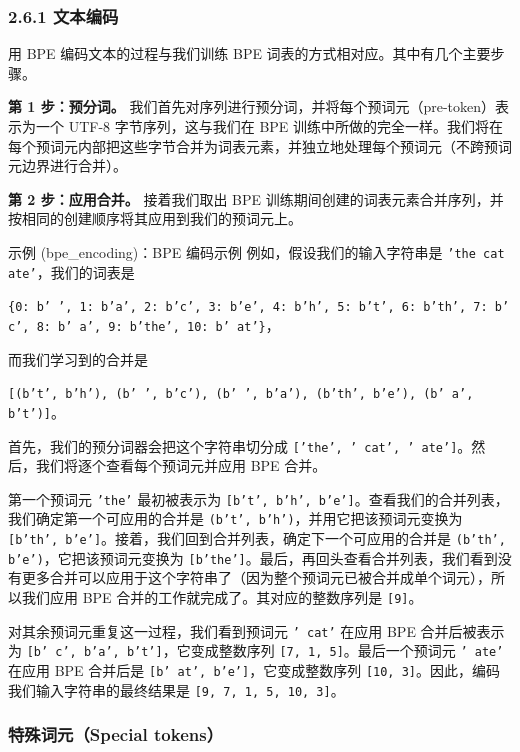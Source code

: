 \subsubsection*{2.6.1 文本编码}

用 BPE 编码文本的过程与我们训练 BPE 词表的方式相对应。其中有几个主要步骤。

\textbf{第 1 步：预分词。} 我们首先对序列进行预分词，并将每个预词元（pre-token）表示为一个 UTF-8 字节序列，这与我们在 BPE 训练中所做的完全一样。我们将在每个预词元内部把这些字节合并为词表元素，并独立地处理每个预词元（不跨预词元边界进行合并）。

\textbf{第 2 步：应用合并。} 接着我们取出 BPE 训练期间创建的词表元素合并序列，并按相同的创建顺序将其应用到我们的预词元上。

\begin{problembox}{示例 (bpe\_encoding)：BPE 编码示例}
例如，假设我们的输入字符串是 \texttt{'the cat ate'}，我们的词表是
\begin{center}
\texttt{\{0: b' ', 1: b'a', 2: b'c', 3: b'e', 4: b'h', 5: b't', 6: b'th', 7: b' c', 8: b' a', 9: b'the', 10: b' at'\}}，
\end{center}
而我们学习到的合并是
\begin{center}
\texttt{[(b't', b'h'), (b' ', b'c'), (b' ', b'a'), (b'th', b'e'), (b' a', b't')]}。
\end{center}
首先，我们的预分词器会把这个字符串切分成 \texttt{['the', ' cat', ' ate']}。然后，我们将逐个查看每个预词元并应用 BPE 合并。

第一个预词元 \texttt{'the'} 最初被表示为 \texttt{[b't', b'h', b'e']}。查看我们的合并列表，我们确定第一个可应用的合并是 \texttt{(b't', b'h')}，并用它把该预词元变换为 \texttt{[b'th', b'e']}。接着，我们回到合并列表，确定下一个可应用的合并是 \texttt{(b'th', b'e')}，它把该预词元变换为 \texttt{[b'the']}。最后，再回头查看合并列表，我们看到没有更多合并可以应用于这个字符串了（因为整个预词元已被合并成单个词元），所以我们应用 BPE 合并的工作就完成了。其对应的整数序列是 \texttt{[9]}。

对其余预词元重复这一过程，我们看到预词元 \texttt{' cat'} 在应用 BPE 合并后被表示为 \texttt{[b' c', b'a', b't']}，它变成整数序列 \texttt{[7, 1, 5]}。最后一个预词元 \texttt{' ate'} 在应用 BPE 合并后是 \texttt{[b' at', b'e']}，它变成整数序列 \texttt{[10, 3]}。因此，编码我们输入字符串的最终结果是 \texttt{[9, 7, 1, 5, 10, 3]}。
\end{problembox}

\subsubsection*{特殊词元（Special tokens）}

